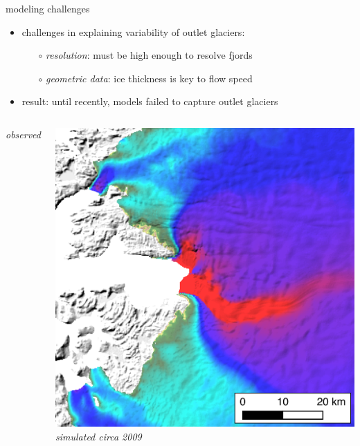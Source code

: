 \documentclass[hide notes,intlimits]{beamer}
\begin{document}
\begin{frame}{modeling challenges}

\begin{itemize}
\item challenges in explaining variability of outlet glaciers:
      \begin{itemize}
      \item[$\circ$] \emph{resolution}:  must be high enough to resolve fjords
      \item[$\circ$] \emph{geometric data}: ice thickness is key to flow speed
      \end{itemize}
\item result: until recently, models failed to capture outlet glaciers
\end{itemize}

  \begin{columns}
    \column[c]{4cm}
    \emph{observed}

\medskip
    \includegraphics[width=\textwidth]{jakobshavn-obs-nogate}
    \column[c]{4cm}
    \emph{simulated circa 2009}


\end{columns}
\end{frame}
\end{document}
